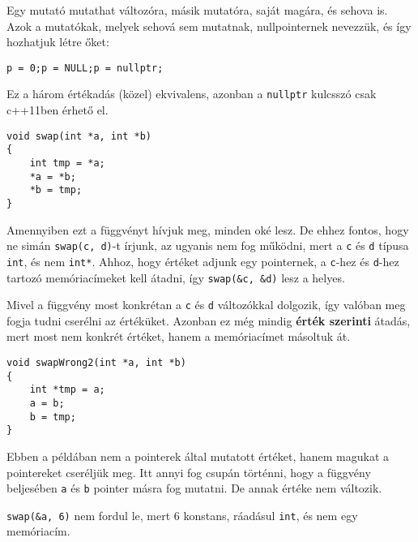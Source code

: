 \documentclass[a4paper,11.5pt]{article}
\begin{document}
		Egy mutató mutathat változóra, másik mutatóra, saját magára, és sehova is. Azok a mutatókak, melyek sehová sem mutatnak, nullpointernek nevezzük, és így hozhatjuk létre őket:
		
		{\centering \texttt{p = 0;\quad \quad p = NULL;\quad \quad p = nullptr;} \par}
		
		\begin{note}
			Ez a három értékadás (közel) ekvivalens, azonban a \texttt{nullptr} kulcsszó csak c++11ben érhető el.
		\end{note}
		
		\begin{lstlisting}
void swap(int *a, int *b)
{
	int tmp = *a;
	*a = *b;
	*b = tmp;
}
		\end{lstlisting}
		
		Amennyiben ezt a függvényt hívjuk meg, minden oké lesz. De ehhez fontos, hogy ne simán \texttt{swap(c, d)}-t írjunk, az ugyanis nem fog működni, mert a \texttt{c} és \texttt{d} típusa \texttt{int}, és nem \texttt{int*}. Ahhoz, hogy értéket adjunk egy pointernek, a \texttt{c}-hez és \texttt{d}-hez tartozó memóriacímeket kell átadni, így \texttt{swap(\&c, \&d)} lesz a helyes.
		\bigskip
		
		Mivel a függvény most konkrétan a \texttt{c} és \texttt{d} változókkal dolgozik, így valóban meg fogja tudni cserélni az értéküket. Azonban ez még mindig \textbf{érték szerinti} átadás, mert most nem konkrét értéket, hanem a memóriacímet másoltuk át.
		
		\begin{lstlisting}
void swapWrong2(int *a, int *b)
{
	int *tmp = a;
	a = b;
	b = tmp;
}
		\end{lstlisting}
		Ebben a példában nem a pointerek által mutatott értéket, hanem magukat a pointereket cseréljük meg. Itt annyi fog csupán történni, hogy a függvény beljesében \texttt{a} és \texttt{b} pointer másra fog mutatni. De annak értéke nem változik.
		
		\medskip
		\texttt{swap(\&a, 6)} nem fordul le, mert 6 konstans, ráadásul \texttt{int}, és nem egy memóriacím.
\end{document}
